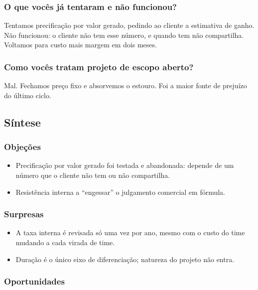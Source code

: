 \subsubsection{O que vocês já tentaram e não funcionou?}

Tentamos precificação por valor gerado, pedindo ao cliente a estimativa de ganho. Não funcionou: o cliente não tem esse número, e quando tem não compartilha. Voltamos para custo mais margem em dois meses.

\subsubsection{Como vocês tratam projeto de escopo aberto?}

Mal. Fechamos preço fixo e absorvemos o estouro. Foi a maior fonte de prejuízo do último ciclo.

\subsection{Síntese}

\subsubsection{Objeções}

\begin{itemize}
  \item Precificação por valor gerado foi testada e abandonada: depende de um número que o cliente não tem ou não compartilha.
  \item Resistência interna a “engessar” o julgamento comercial em fórmula.
\end{itemize}

\subsubsection{Surpresas}

\begin{itemize}
  \item A taxa interna é revisada só uma vez por ano, mesmo com o custo do time mudando a cada virada de time.
  \item Duração é o único eixo de diferenciação; natureza do projeto não entra.
\end{itemize}

\subsubsection{Oportunidades}

